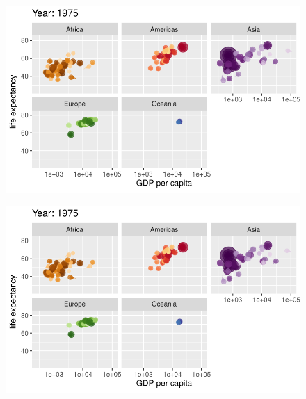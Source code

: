 \documentclass[
  letterpaper,
  DIV=11,
  numbers=noendperiod]{scrartcl}
\begin{document}
\begin{figure}[H]

{\centering \includegraphics{class05_files/figure-pdf/unnamed-chunk-24-42.pdf}

}

\end{figure}

\begin{figure}[H]

{\centering \includegraphics{class05_files/figure-pdf/unnamed-chunk-24-43.pdf}

}

\end{figure}
\end{document}

